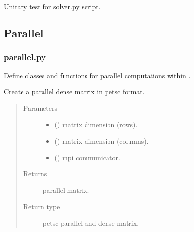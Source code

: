 \documentclass[letterpaper,10pt,english]{sphinxmanual}
\begin{document}
\begin{fulllineitems}
\label{\detokenize{petgem/solver:petgem.solver.unitary_test}}
Unitary test for solver.py script.

\end{fulllineitems}



\subsection{Parallel}
\label{\detokenize{Manual:parallel}}

\subsubsection{parallel.py}
\label{\detokenize{petgem/parallel:module-petgem.parallel}}\label{\detokenize{petgem/parallel:parallel-py}}\label{\detokenize{petgem/parallel::doc}}
Define classes and functions for parallel computations within .

\begin{fulllineitems}
\label{\detokenize{petgem/parallel:petgem.parallel.createParallelDenseMatrix}}
Create a parallel dense matrix in petsc format.
\begin{quote}\begin{description}
\item[{Parameters}] \leavevmode\begin{itemize}
\item {} 
 () \textendash{} matrix dimension (rows).

\item {} 
 () \textendash{} matrix dimension (columns).

\item {} 
 () \textendash{} mpi communicator.

\end{itemize}

\item[{Returns}] \leavevmode
parallel matrix.

\item[{Return type}] \leavevmode
petsc parallel and dense matrix.

\end{description}\end{quote}

\end{fulllineitems}
\end{document}
